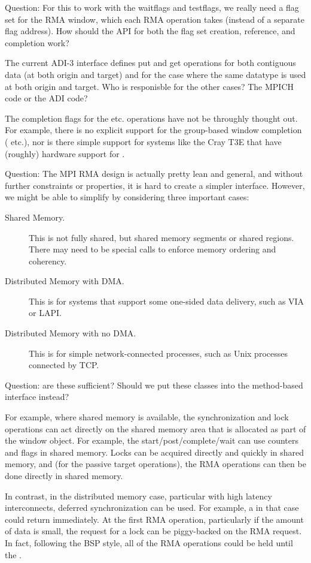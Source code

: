 \documentclass{article}
\begin{document}
Question:  For this to work with the waitflags and testflags, we
really need a flag set for the RMA window, which each RMA operation
takes (instead of a separate flag address).  How should the API for
both the flag set creation, reference, and completion work?  

The current ADI-3 interface defines put and get operations for both
contiguous data (at both origin and target) and for the case where the
same datatype is used at both origin and target.  Who is responisble
for the other cases?  The MPICH code or the ADI code?

The completion flags for the  etc. operations
have not be throughly thought out.  For example, there is no explicit
support for the group-based window completion (
etc.), nor is there simple support for systems like the Cray T3E that
have (roughly) hardware support for .

Question: The MPI RMA design is actually pretty lean and general, and
without further constraints or properties, it is hard to create a
simpler interface.  However, we might be able to simplify by
considering three important cases:
\begin{description}
\item[Shared Memory.]This is not fully shared, but shared memory
segments or shared  regions. There may need to be special
calls to enforce memory ordering and coherency.
\item[Distributed Memory with DMA.]This is for systems that support
some one-sided data delivery, such as VIA or LAPI.
\item[Distributed Memory with no DMA.]This is for simple
network-connected processes, such as Unix processes connected by TCP.
\end{description}
Question: are these sufficient?  Should we put these classes into the
method-based interface instead?

For example, where shared memory is available, the synchronization and
lock operations can act directly on the shared memory area that is
allocated as part of the window object.  For example, the
start/post/complete/wait can use counters and flags in shared memory.
Locks can be acquired directly and quickly in shared memory, and (for
the passive target operations), the RMA operations can then be done
directly in shared memory.

In contrast, in the distributed memory case, particular with high
latency interconnects, deferred synchronization can be used.  For
example, a  in that case could return immediately.
At the first RMA operation, particularly if the amount of data is
small, the request for a lock can be piggy-backed on the RMA request.
In fact, following the BSP style, all of the RMA operations could be
held until the .
\end{document}
